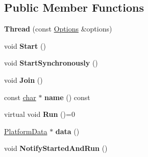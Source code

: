 \subsection*{Public Member Functions}
\begin{DoxyCompactItemize}
\item 
\mbox{\label{classv8_1_1base_1_1Thread_a3ddcd0a37fd3751be4e1cac06bedc447}} 
{\bfseries Thread} (const \mbox{\hyperlink{classv8_1_1base_1_1Thread_1_1Options}{Options}} \&options)
\item 
\mbox{\label{classv8_1_1base_1_1Thread_a456aa1166279b4b0394abb2efe082753}} 
void {\bfseries Start} ()
\item 
\mbox{\label{classv8_1_1base_1_1Thread_a7001182e6207ce8dccb8fd0a8d5f3864}} 
void {\bfseries Start\+Synchronously} ()
\item 
\mbox{\label{classv8_1_1base_1_1Thread_a03b039733dcd3df63085e74c587df9b7}} 
void {\bfseries Join} ()
\item 
\mbox{\label{classv8_1_1base_1_1Thread_aa8ce4978d083d9790f64a7685347ee9b}} 
const \mbox{\hyperlink{classchar}{char}} $\ast$ {\bfseries name} () const
\item 
\mbox{\label{classv8_1_1base_1_1Thread_a04c541b44be4fe9e6a878684e5232a87}} 
virtual void {\bfseries Run} ()=0
\item 
\mbox{\label{classv8_1_1base_1_1Thread_a835107ac2f4dd322ef7998c8b543b336}} 
\mbox{\hyperlink{classv8_1_1base_1_1Thread_1_1PlatformData}{Platform\+Data}} $\ast$ {\bfseries data} ()
\item 
\mbox{\label{classv8_1_1base_1_1Thread_af31dcce079481573bddda99840e56a88}} 
void {\bfseries Notify\+Started\+And\+Run} ()
\end{DoxyCompactItemize}
